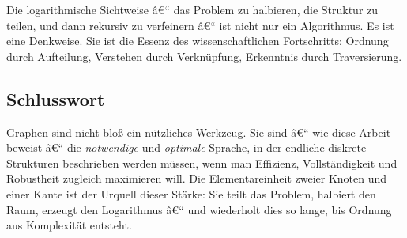 ﻿\documentclass[12pt,a4paper,twoside]{article}
\theoremstyle{definition}
\theoremstyle{plain}
\theoremstyle{remark}
\begin{document}
Die logarithmische Sichtweise â€“ das Problem zu halbieren,
die Struktur zu teilen, und dann rekursiv zu verfeinern â€“
ist nicht nur ein Algorithmus.  Es ist eine Denkweise.
Sie ist die Essenz des wissenschaftlichen Fortschritts:
Ordnung durch Aufteilung, Verstehen durch Verknüpfung,
Erkenntnis durch Traversierung.

\subsection{Schlusswort}

Graphen sind nicht bloß ein nützliches Werkzeug.  Sie sind â€“
wie diese Arbeit beweist â€“ die \emph{notwendige} und
\emph{optimale} Sprache, in der endliche diskrete Strukturen
beschrieben werden müssen, wenn man Effizienz, Vollständigkeit
und Robustheit zugleich maximieren will.  Die Elementareinheit
zweier Knoten und einer Kante ist der Urquell dieser Stärke:
Sie teilt das Problem, halbiert den Raum, erzeugt den
Logarithmus â€“ und wiederholt dies so lange, bis Ordnung aus
Komplexität entsteht.
\end{document}

